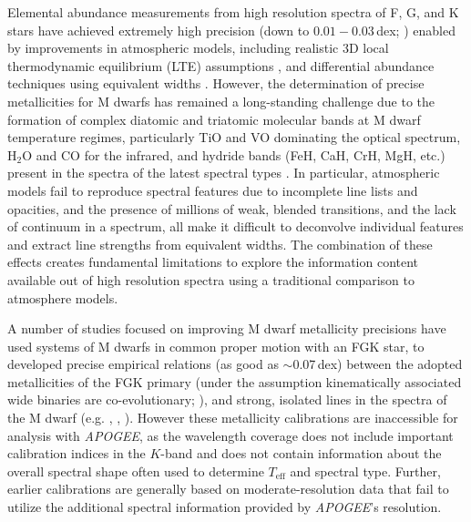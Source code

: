 \documentclass[modern]{aastex62}
\newcommand{\apogee}{\textsl{APOGEE}}
\newcommand{\teff}{T_{\mathrm{eff}}}
\begin{document}
Elemental abundance measurements from high resolution spectra of F, G, and K stars have achieved extremely high precision (down to $0.01-0.03$\,dex; \citealt{Nissen2018}) enabled by improvements in atmospheric models, including realistic 3D local thermodynamic equilibrium (LTE) assumptions \citep{Asplund2005}, and differential abundance techniques using equivalent widths \citep{Bedell2014}. However, the determination of precise metallicities for M dwarfs has remained a long-standing challenge due to the formation of complex diatomic and triatomic molecular bands at M dwarf temperature regimes, particularly TiO and VO dominating the optical spectrum, H$_2$O and CO for the infrared, and hydride bands (FeH, CaH, CrH, MgH, etc.) present in the spectra of the latest spectral types \citep{Allard1997}.
In particular, atmospheric models fail to reproduce spectral features \citep[e.g.,][]{Mann:2013c} due to incomplete line lists and opacities, and the presence of millions of weak, blended transitions, and the lack of continuum in a spectrum, all make it difficult to deconvolve individual features and extract line strengths from equivalent widths. The combination of these effects creates fundamental limitations to explore the information content available out of high resolution spectra using a traditional comparison to atmosphere models.

A number of studies focused on improving M dwarf metallicity precisions have used systems of M dwarfs in common proper motion with an FGK star, to developed precise empirical relations (as good as $\sim$0.07\,dex) between the adopted metallicities of the FGK primary (under the assumption kinematically associated wide binaries are co-evolutionary; \citealt{Bonfils:2005}), and strong, isolated lines in the spectra of the M dwarf (e.g. \citealt{Terrien:2012}, \citealt{Rojas-Ayala:2012}, \citealt{Newton:2014}). However these metallicity calibrations are inaccessible for analysis with \apogee, as the wavelength coverage does not include important calibration indices in the $K$-band and does not contain information about the overall spectral shape often used to determine $\teff$ and spectral type. Further, earlier calibrations are generally based on moderate-resolution data \citep[with some exceptions,][]{Neves:2014, Lindgren:2016} that fail to utilize the additional spectral information provided by \apogee's resolution.

\end{document}
